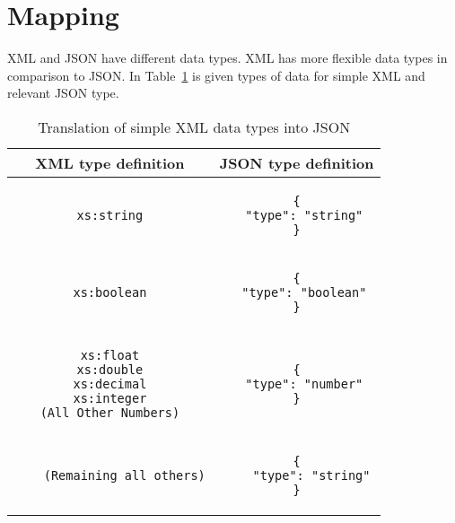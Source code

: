 \section{Mapping}
XML and JSON have different data types. XML has more flexible data types in comparison to JSON. In Table~\ref{tbl:xml-json:types} is given types of data for simple XML and relevant JSON type.
\begin{longtable}{c|c}
\caption{Translation of simple XML data types into JSON}
\label{tbl:xml-json:types}\\

\textbf{XML type definition} & \textbf{JSON type definition}\\
\hline

\begin{minipage}{.4\textwidth}
  \begin{lstlisting}
xs:string
  \end{lstlisting}
\end{minipage} &
\begin{minipage}{.4\textwidth}
\begin{lstlisting}
{
  "type": "string"
}
\end{lstlisting}
\end{minipage}\\

\hline
\begin{minipage}{.4\textwidth}
  \begin{lstlisting}
xs:boolean
  \end{lstlisting}
\end{minipage} &
\begin{minipage}{.4\textwidth}
\begin{lstlisting}
{
  "type": "boolean"
}
\end{lstlisting}
\end{minipage}\\

\hline
\begin{minipage}{.4\textwidth}
  \begin{lstlisting}
xs:float
xs:double
xs:decimal
xs:integer
(All Other Numbers)
  \end{lstlisting}
\end{minipage} &
\begin{minipage}{.4\textwidth}
\begin{lstlisting}
{
  "type": "number"
}
\end{lstlisting}
\end{minipage}\\
\hline

\begin{minipage}{.4\textwidth}
	\begin{lstlisting}
	(Remaining all others)
	\end{lstlisting}
\end{minipage} &
\begin{minipage}{.4\textwidth}
\begin{lstlisting}
{
	"type": "string"
}
\end{lstlisting}
\end{minipage}\\
\end{longtable}
